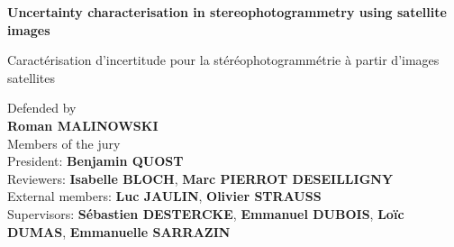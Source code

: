 \begin{titlepage}
    \begin{center}
        \Huge
        \textbf{Uncertainty characterisation in stereophotogrammetry using satellite images}
            
        \vspace{0.5cm}
        \LARGE
        Caractérisation d'incertitude pour la stéréophotogrammétrie à partir d'images satellites

        \vspace{1.cm}
        \large
        Defended by\\
        \textbf{Roman MALINOWSKI}\\
        \vspace{0.8cm}
        Members of the jury\\
        
        \vspace{0.2cm}
        President: \textbf{Benjamin QUOST}\\
        Reviewers: \textbf{Isabelle BLOCH}, \textbf{Marc PIERROT DESEILLIGNY}\\
        External members: \textbf{Luc JAULIN}, \textbf{Olivier STRAUSS}\\
        Supervisors: \textbf{Sébastien DESTERCKE}, \textbf{Emmanuel DUBOIS}, \textbf{Loïc DUMAS}, \textbf{Emmanuelle SARRAZIN}\\
    

\end{center}
\end{titlepage}
